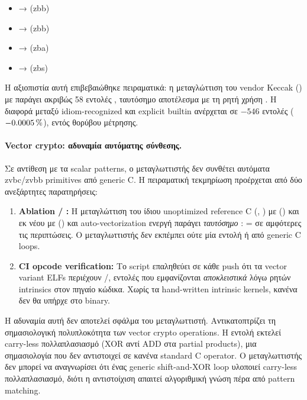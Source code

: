 \begin{itemize}
  \item {} → \rori (\gls{zbb})
  \item {} →  (\gls{zbb})
  \item {} →  (\gls{zba})
  \item {} →  (\gls{zbs})
\end{itemize}

Η αξιοπιστία αυτή επιβεβαιώθηκε πειραματικά: η μεταγλώττιση του vendor
Keccak () με  παράγει
ακριβώς \num{58} εντολές \rori, ταυτόσημο αποτέλεσμα με τη ρητή χρήση
. Η διαφορά \instret μεταξύ idiom-recognized
και explicit builtin ανέρχεται σε $-\num{546}$ εντολές ($-\SI{0.0005}{\percent}$),
εντός θορύβου μέτρησης.

\paragraph{Vector crypto: αδυναμία αυτόματης σύνθεσης.}
Σε αντίθεση με τα scalar patterns, ο μεταγλωττιστής δεν συνθέτει αυτόματα
\gls{zvbc}/\gls{zvbb} primitives από generic C. Η πειραματική τεκμηρίωση
προέρχεται από δύο ανεξάρτητες παρατηρήσεις:

\begin{enumerate}
  \item \textbf{Ablation  / :}
    Η μεταγλώττιση του ίδιου unoptimized reference C (,
    ) με  ()
    και εκ νέου με 
    () και auto-vectorization ενεργή παράγει
    \emph{ταυτόσημο} \instret:  =  σε
    αμφότερες τις περιπτώσεις. Ο μεταγλωττιστής δεν εκπέμπει ούτε μία εντολή
    \vclmul ή  από generic C loops.

  \item \textbf{CI opcode verification:} Το script
     επαληθεύει σε κάθε push ότι τα vector
    variant ELFs περιέχουν \vclmul/\vclmulh, εντολές που εμφανίζονται
    \emph{αποκλειστικά} λόγω ρητών intrinsics στον πηγαίο κώδικα.
    Χωρίς τα hand-written intrinsic kernels, κανένα \vclmul δεν θα
    υπήρχε στο binary.
\end{enumerate}

Η αδυναμία αυτή δεν αποτελεί σφάλμα του μεταγλωττιστή. Αντικατοπτρίζει τη
σημασιολογική πολυπλοκότητα των vector crypto operations. Η εντολή
\vclmul εκτελεί carry-less πολλαπλασιασμό (XOR αντί ADD στα partial
products), μια σημασιολογία που δεν αντιστοιχεί σε κανένα standard C
operator. Ο μεταγλωττιστής δεν μπορεί να αναγνωρίσει ότι ένας generic
shift-and-XOR loop υλοποιεί carry-less πολλαπλασιασμό, διότι η
αντιστοίχιση απαιτεί αλγοριθμική γνώση πέρα από pattern matching.

